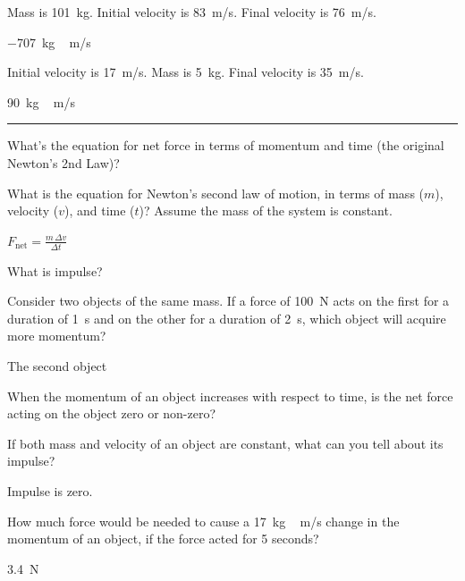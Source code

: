 \documentclass[]{exam}
\begin{document}
\begin{questions}
\question \label{qSPMmV}
Mass is \SI{101}{kg}. Initial velocity is \SI{83}{m/s}. Final velocity is \SI{76}{m/s}. 

\begin{solution}
\SI{-707}{kg\,m/s}
\end{solution}


\question \label{4phY3A}
Initial velocity is \SI{17}{m/s}. Mass is \SI{5}{kg}. Final velocity is \SI{35}{m/s}. 

\begin{solution}
\SI{90}{kg\,m/s}
\end{solution}

\bigskip

\hrule

\question
What's the equation for net force in terms of momentum and time (the original Newton's 2nd Law)?


\question \label{9CaNPq}
What is the equation for Newton's second law of motion, in terms of mass ($m$), velocity ($v$), and time ($t$)? Assume the mass of the system is constant.

\begin{solution}
$F_{\text{net}} = \frac{m\,\Delta v}{\Delta t}$
\end{solution}

\question
What is impulse?


\question \label{6HJcp6}
Consider two objects of the same mass. If a force of \SI{100}{N}  acts on the first for a duration of \SI{1}{s}  and on the other for a duration of \SI{2}{s}, which object will acquire more momentum?

\begin{solution}
The second object
\end{solution}


\question
When the momentum of an object increases with respect to time, is the net force acting on the object zero or non-zero?


\question \label{ukvCcg}
If both mass and velocity of an object are constant, what can you tell about its impulse?

\begin{solution}
Impulse is zero.
\end{solution}


\question \label{dAVKAB}
How much force would be needed to cause a \SI{17}{kg\,m/s} change in the momentum of an object, if the force acted for 5 seconds?

\begin{solution}
\SI{3.4}{N}
\end{solution}



\end{questions}
\end{document}
